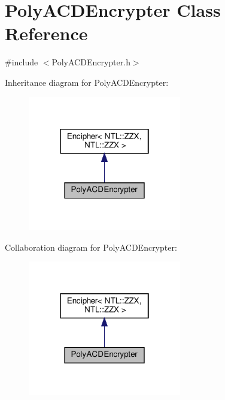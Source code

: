 \hypertarget{classPolyACDEncrypter}{}\section{Poly\+A\+C\+D\+Encrypter Class Reference}
\label{classPolyACDEncrypter}


{\ttfamily \#include $<$Poly\+A\+C\+D\+Encrypter.\+h$>$}



Inheritance diagram for Poly\+A\+C\+D\+Encrypter\+:\nopagebreak
\begin{figure}[H]
\begin{center}
\leavevmode
\includegraphics[width=190pt]{classPolyACDEncrypter__inherit__graph}
\end{center}
\end{figure}


Collaboration diagram for Poly\+A\+C\+D\+Encrypter\+:\nopagebreak
\begin{figure}[H]
\begin{center}
\leavevmode
\includegraphics[width=190pt]{classPolyACDEncrypter__coll__graph}
\end{center}
\end{figure}
